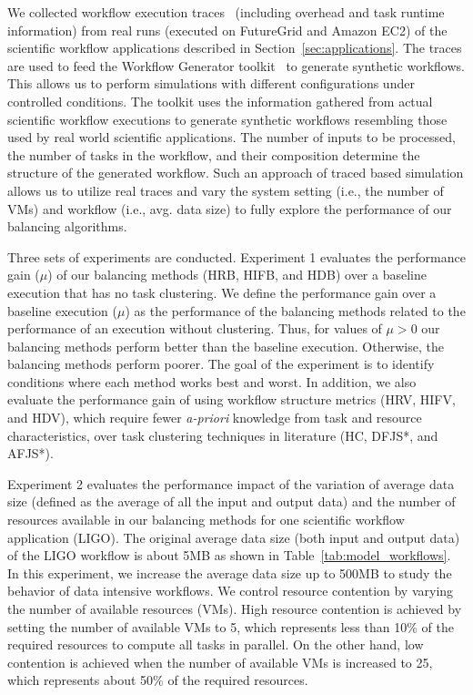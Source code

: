 We collected workflow execution traces~\cite{Juve2013,Chen2011} (including overhead and task runtime information) from real runs (executed on FutureGrid and Amazon EC2) of the scientific workflow applications described in Section~\ref{sec:applications}. The traces are used to feed the Workflow Generator toolkit~\cite{WorkflowGenerator} to generate synthetic workflows. This allows us to perform simulations with different configurations under controlled conditions. The toolkit uses the information gathered from actual scientific workflow executions to generate synthetic workflows resembling those used by real world scientific applications. The number of inputs to be processed, the number of tasks in the workflow, and their composition determine the structure of the generated workflow. Such an approach of traced based simulation allows us to utilize real traces and vary the system setting (i.e., the number of VMs) and workflow (i.e., avg. data size) to fully explore the performance of our balancing algorithms. 

Three sets of experiments are conducted. Experiment 1 evaluates the performance gain ($\mu$) of our balancing methods (HRB, HIFB, and HDB) over a baseline execution that has no task clustering. We define the performance gain over a baseline execution ($\mu$) as the performance of the balancing methods related to the performance of an execution without clustering. Thus, for values of $\mu > 0$ our balancing methods perform better than the baseline execution. Otherwise, the balancing methods perform poorer. The goal of the experiment is to identify conditions where each method works best and worst. In addition, we also evaluate the performance gain of using workflow structure metrics (HRV, HIFV, and HDV), which require fewer \emph{a-priori} knowledge from task and resource characteristics, over task clustering techniques in literature (HC, DFJS*, and AFJS*).

Experiment 2 evaluates the performance impact of the variation of average data size (defined as the average of all the input and output data) and the number of resources available in our balancing methods for one scientific workflow application (LIGO). The original average data size (both input and output data) of the LIGO workflow is about 5MB as shown in Table~\ref{tab:model_workflows}. In this experiment, we increase the average data size up to 500MB to study the behavior of data intensive workflows. We control resource contention by varying the number of available resources (VMs). High resource contention is achieved by setting the number of available VMs to 5, which represents less than 10\% of the required resources to compute all tasks in parallel. On the other hand, low contention is achieved when the number of available VMs is increased to 25, which represents about 50\% of the required resources.

